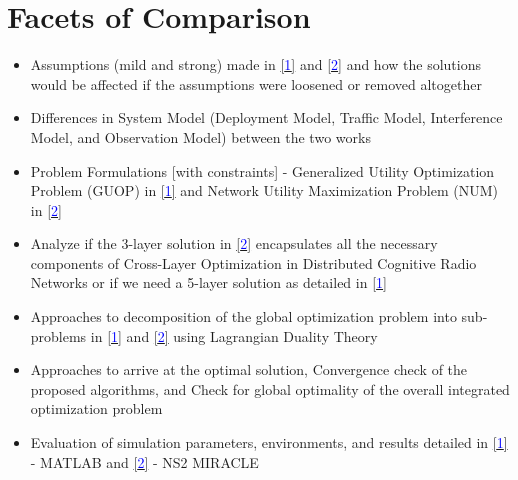 \documentclass[12pt, draftcls, onecolumn]{IEEEtran}
\begin{document}
\section{Facets of Comparison}
\begin{itemize}
    \item Assumptions (mild and strong) made in \href{http://ieeexplore.ieee.org/stamp/stamp.jsp?tp=&arnumber=7859326&isnumber=7859429}{[\textcolor{blue}{1}]} and \href{http://ieeexplore.ieee.org/stamp/stamp.jsp?tp=&arnumber=6881740&isnumber=7180482}{[\textcolor{blue}{2}]} and how the solutions would be affected if the assumptions were loosened or removed altogether
    \item Differences in System Model (Deployment Model, Traffic Model, Interference Model, and Observation Model) between the two works
    \item Problem Formulations [with constraints] - Generalized Utility Optimization Problem (GUOP) in \href{http://ieeexplore.ieee.org/stamp/stamp.jsp?tp=&arnumber=7859326&isnumber=7859429}{[\textcolor{blue}{1}]} and Network Utility Maximization Problem (NUM) in \href{http://ieeexplore.ieee.org/stamp/stamp.jsp?tp=&arnumber=6881740&isnumber=7180482}{[\textcolor{blue}{2}]}
    \item Analyze if the 3-layer solution in \href{http://ieeexplore.ieee.org/stamp/stamp.jsp?tp=&arnumber=6881740&isnumber=7180482}{[\textcolor{blue}{2}]} encapsulates all the necessary components of Cross-Layer Optimization in Distributed Cognitive Radio Networks or if we need a 5-layer solution as detailed in \href{http://ieeexplore.ieee.org/stamp/stamp.jsp?tp=&arnumber=7859326&isnumber=7859429}{[\textcolor{blue}{1}]}
    \item Approaches to decomposition of the global optimization problem into sub-problems in \href{http://ieeexplore.ieee.org/stamp/stamp.jsp?tp=&arnumber=7859326&isnumber=7859429}{[\textcolor{blue}{1}]} and \href{http://ieeexplore.ieee.org/stamp/stamp.jsp?tp=&arnumber=6881740&isnumber=7180482}{[\textcolor{blue}{2}]} using Lagrangian Duality Theory
    \item Approaches to arrive at the optimal solution, Convergence check of the proposed algorithms, and Check for global optimality of the overall integrated optimization problem
    \item Evaluation of simulation parameters, environments, and results detailed in \href{http://ieeexplore.ieee.org/stamp/stamp.jsp?tp=&arnumber=7859326&isnumber=7859429}{[\textcolor{blue}{1}]} - MATLAB and \href{http://ieeexplore.ieee.org/stamp/stamp.jsp?tp=&arnumber=6881740&isnumber=7180482}{[\textcolor{blue}{2}]} - NS2 MIRACLE
\end{itemize}
\clearpage
\end{document}
